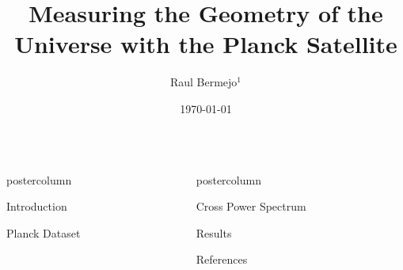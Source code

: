 \documentclass{beamer}
\title{\huge Measuring the Geometry of the Universe with the Planck Satellite}
\author{Raul Bermejo$^{1}$}
\institute[UniMelb]{$^{1}$School of Physics, University of Melbourne}
\date{\today}
\newlength{\columnheight}
\begin{document}
\begin{frame}
\begin{columns}
	\begin{column}{.51\textwidth}
		\begin{beamercolorbox}[center]{postercolumn}
			\begin{minipage}{.98\textwidth}  %
				\parbox[t][\columnheight]{\textwidth}{ %
					\begin{myblock}{Introduction}	
				
						
					\end{myblock}\vfill
					
					
					\begin{myblock}{Planck Dataset}
					
					\end{myblock}\vfill
		}\end{minipage}\end{beamercolorbox}
	\end{column}
	
	
	\begin{column}{.49\textwidth}
		\begin{beamercolorbox}[center]{postercolumn}
			\begin{minipage}{.98\textwidth} %
				\parbox[t][\columnheight]{\textwidth}{ %
					\begin{myblock}{Cross Power Spectrum}
					
					
					\end{myblock}\vfill
					
					
					\begin{myblock}{Results}
					
					\end{myblock}\vfill
					
					
					
					\begin{myblock}{References}
						\footnotesize
						
						
					\end{myblock}\vfill
		}\end{minipage}\end{beamercolorbox}
	\end{column}
\end{columns}
\end{frame}
\end{document}
